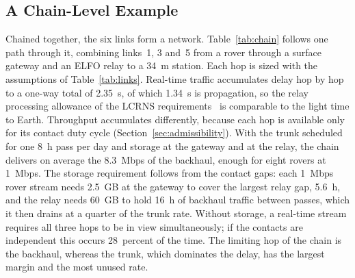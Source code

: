 \documentclass{IEEEoj}
\begin{document}
\subsection{A Chain-Level Example}
Chained together, the six links form a network. Table~\ref{tab:chain} follows one path through it, combining links~1, 3 and~5 from a rover through a surface gateway and an ELFO relay to a \SI{34}{m} station. Each hop is sized with the assumptions of Table~\ref{tab:links}. Real-time traffic accumulates delay hop by hop to a one-way total of \SI{2.35}{\second}, of which \SI{1.34}{\second} is propagation, so the relay processing allowance of the LCRNS requirements~\cite{nasa_lunar_relay_srd} is comparable to the light time to Earth. Throughput accumulates differently, because each hop is available only for its contact duty cycle (Section~\ref{sec:admissibility}). With the trunk scheduled for one \SI{8}{h} pass per day and storage at the gateway and at the relay, the chain delivers on average the \SI{8.3}{Mbps} of the backhaul, enough for eight rovers at \SI{1}{Mbps}. The storage requirement follows from the contact gaps: each \SI{1}{Mbps} rover stream needs \SI{2.5}{GB} at the gateway to cover the largest relay gap, \SI{5.6}{h}, and the relay needs \SI{60}{GB} to hold \SI{16}{h} of backhaul traffic between passes, which it then drains at a quarter of the trunk rate. Without storage, a real-time stream requires all three hops to be in view simultaneously; if the contacts are independent this occurs 28~percent of the time. The limiting hop of the chain is the backhaul, whereas the trunk, which dominates the delay, has the largest margin and the most unused rate.
\end{document}
